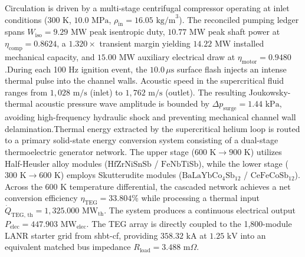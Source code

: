 \begin{sloppypar}
Circulation is driven by a multi-stage centrifugal compressor operating at inlet conditions ($300\text{ K}$, $10.0\text{ MPa}$, $\rho_{\text{in}} = 16.05\text{ kg/m}^3$). The reconciled pumping ledger spans $W_{\text{iso}} = 9.29\text{ MW}$ peak isentropic duty, $10.77\text{ MW}$ peak shaft power at $\eta_{\text{comp}} = 0.8624$, a $1.320\times$ transient margin yielding $14.22\text{ MW}$ installed mechanical capacity, and $15.00\text{ MW}$ auxiliary electrical draw at $\eta_{\text{motor}} = 0.9480$.During each 100 Hz ignition event, the $10.0\,\mu\text{s}$ surface flash injects an intense thermal pulse into the channel walls. Acoustic speed in the supercritical fluid ranges from $1,028\text{ m/s}$ (inlet) to $1,762\text{ m/s}$ (outlet). The resulting Joukowsky-thermal acoustic pressure wave amplitude is bounded by $\Delta p_{\text{surge}} = 1.44\text{ kPa}$, avoiding high-frequency hydraulic shock and preventing mechanical channel wall delamination.Thermal energy extracted by the supercritical helium loop is routed to a primary solid-state energy conversion system consisting of a dual-stage thermoelectric generator network. The upper stage ($600\text{ K} \to 900\text{ K}$) utilizes Half-Heusler alloy modules ($\text{HfZrNiSnSb}$ / $\text{FeNbTiSb}$), while the lower stage ($300\text{ K} \to 600\text{ K}$) employs Skutterudite modules ($\text{BaLaYbCo}_4\text{Sb}_{12}$ / $\text{CeFeCoSb}_{12}$). Across the 600 K temperature differential, the cascaded network achieves a net conversion efficiency $\eta_{\text{TEG}} = 33.804\%$ while processing a thermal input $\dot{Q}_{\text{TEG, th}} = 1,325.000\text{ MW}_{\text{th}}$. The system produces a continuous electrical output $P_{\text{elec}} = 447.903\text{ MW}_{\text{elec}}$. The TEG array is directly coupled to the 1,800-module LANR starter grid from shbt-cf, providing $358.32\text{ kA}$ at $1.25\text{ kV}$ into an equivalent matched bus impedance $R_{\text{load}} = 3.488\text{ m}\Omega$.\end{sloppypar}
